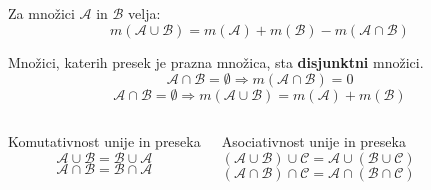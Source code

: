 \begin{frame}
\begin{columns}[T]
                \begin{block}{}
                \end{block}

        \end{columns}
    \end{frame}

    \begin{frame}

        \begin{block}{}
            Za množici $\mathcal{A}$ in $\mathcal{B}$ velja:
            $$m(\mathcal{A}\cup\mathcal{B})=m(\mathcal{A})+m(\mathcal{B})-m(\mathcal{A}\cap\mathcal{B}) $$
        \end{block}

        \begin{block}{}
            Množici, katerih presek je prazna množica, sta \textbf{disjunktni} množici.
            $$\mathcal{A}\cap\mathcal{B}=\emptyset\Rightarrow m(\mathcal{A}\cap\mathcal{B})=0 $$ 
            $$\mathcal{A}\cap\mathcal{B}=\emptyset\Rightarrow m(\mathcal{A}\cup\mathcal{B})=m(\mathcal{A})+m(\mathcal{B}) $$
        \end{block}

        \begin{columns}[T]
                \begin{block}{Komutativnost unije in preseka}
                    $$ \mathcal{A}\cup\mathcal{B}=\mathcal{B}\cup\mathcal{A} $$
                    $$ \mathcal{A}\cap\mathcal{B}=\mathcal{B}\cap\mathcal{A} $$
                \end{block}

                \begin{block}{Asociativnost unije in preseka}
                    $$ \left(\mathcal{A}\cup\mathcal{B}\right)\cup\mathcal{C}=\mathcal{A}\cup\left(\mathcal{B}\cup\mathcal{C}\right) $$
                    $$ \left(\mathcal{A}\cap\mathcal{B}\right)\cap\mathcal{C}=\mathcal{A}\cap\left(\mathcal{B}\cap\mathcal{C}\right) $$
                \end{block}

        \end{columns}

    \end{frame}

